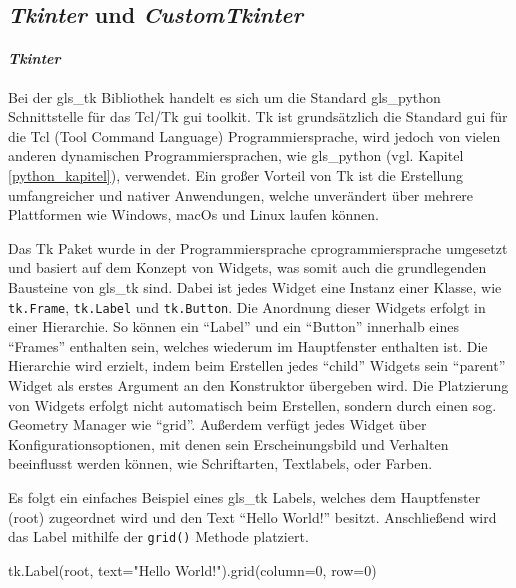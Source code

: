 \subsection{\textit{Tkinter} und \textit{CustomTkinter}}\label{tkinter_kapitel}
\paragraph{\textit{Tkinter}}\label{tk_kapitel}
Bei der \gls{gls_tk} Bibliothek handelt es sich um die Standard \gls{gls_python} Schnittstelle für das Tcl/Tk \ac{gui} toolkit. Tk ist grundsätzlich die Standard \acs{gui} für die Tcl (Tool Command Language) Programmiersprache, wird jedoch von vielen anderen dynamischen Programmiersprachen, wie \zB \gls{gls_python} (vgl. Kapitel \ref{python_kapitel}), verwendet. Ein großer Vorteil von Tk ist die Erstellung umfangreicher und nativer Anwendungen, welche unverändert über mehrere Plattformen wie Windows, macOs und Linux laufen können. \cite[vgl.][]{Python_Software_Foundation_Tk:o.J., Tcl_Developer_Xchange:o.J.}

Das Tk Paket wurde in der Programmiersprache \gls{cprogrammiersprache} umgesetzt und basiert auf dem Konzept von Widgets, was somit auch die grundlegenden Bausteine von \gls{gls_tk} sind. Dabei ist jedes Widget eine Instanz einer Klasse, wie \zB \lstinline{tk.Frame}, \lstinline{tk.Label} und \lstinline{tk.Button}. Die Anordnung dieser Widgets erfolgt in einer Hierarchie. So können \zB ein \enquote{Label} und ein \enquote{Button} innerhalb eines \enquote{Frames} enthalten sein, welches wiederum im Hauptfenster enthalten ist. Die Hierarchie wird erzielt, indem beim Erstellen jedes \enquote{child} Widgets sein \enquote{parent} Widget als erstes Argument an den Konstruktor übergeben wird. Die Platzierung von Widgets erfolgt nicht automatisch beim Erstellen, sondern durch einen sog. Geometry Manager wie \enquote{grid}. Außerdem verfügt jedes Widget über Konfigurationsoptionen, mit denen sein Erscheinungsbild und Verhalten beeinflusst werden können, wie \zB Schriftarten, Textlabels, oder Farben. \cite[vgl.][]{Python_Software_Foundation_Tk:o.J., Shipman:2013}

Es folgt ein einfaches Beispiel eines \gls{gls_tk} Labels, welches dem Hauptfenster (root) zugeordnet wird und den Text \enquote{Hello World!} besitzt. Anschließend wird das Label mithilfe der \lstinline{grid()} Methode platziert. 
\begin{pythoncode}
tk.Label(root, text="Hello World!").grid(column=0, row=0)
\end{pythoncode}

